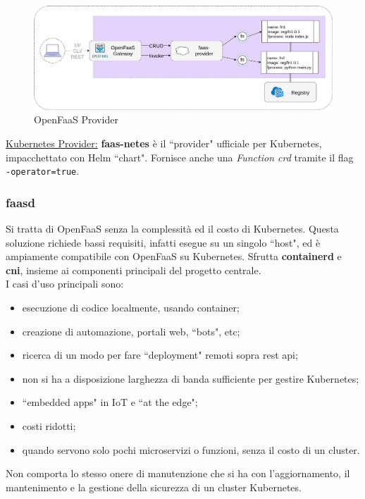 \documentclass[12pt,a4paper,openany,twoside]{book}
\begin{document}
\begin{figure}[h]
    \centering
    \includegraphics[width=\linewidth]{figures/OpenFaaS_provider.pdf}
    \caption{OpenFaaS Provider}
    \label{fig:openfaas-provider}
\end{figure}

\noindent
\underline{Kubernetes Provider:} \textbf{faas-netes} è il ``provider" ufficiale per Kubernetes, impacchettato con Helm ``chart". Fornisce anche una \textit{Function \ac{crd}} tramite il flag \texttt{-operator=true}.

\subsubsection{faasd}

Si tratta di OpenFaaS senza la complessità ed il costo di Kubernetes. Questa soluzione richiede bassi requisiti, infatti esegue su un singolo ``host", ed è ampiamente compatibile con OpenFaaS su Kubernetes.
Sfrutta \textbf{containerd} e \textbf{\ac{cni}}, insieme ai componenti principali del progetto centrale.
\\
I casi d'uso principali sono:
\begin{itemize}
    \item esecuzione di codice localmente, usando container;
    
    \item creazione di automazione, portali web, ``bots", etc;
    
    \item ricerca di un modo per fare ``deployment" remoti sopra \ac{rest} \ac{api};
    
    \item non si ha a disposizione larghezza di banda sufficiente per gestire Kubernetes;
    
    \item ``embedded apps" in \ac{IoT} e ``at the edge";
    
    \item costi ridotti;
    
    \item quando servono solo pochi microservizi o funzioni, senza il costo di un cluster.
\end{itemize}
Non comporta lo stesso onere di manutenzione che si ha con l'aggiornamento, il mantenimento e la gestione della sicurezza di un cluster Kubernetes.
\end{document}
